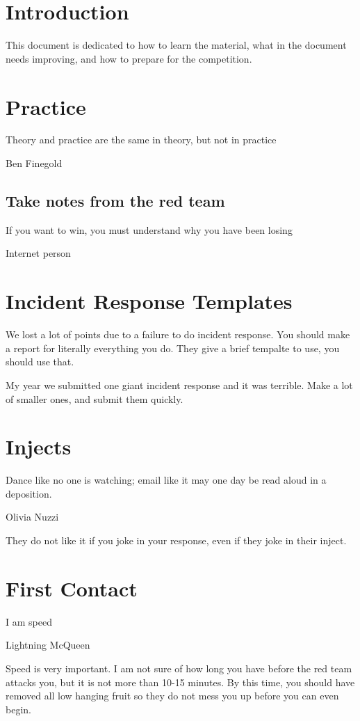 \documentclass{article}
\begin{document}
\graphicspath{ {./Images/} }
\tableofcontents

\section{Introduction}
This document is dedicated to how to learn the material, what in the document needs improving, and how to prepare for the competition.

\section{Practice}
\epigraph{Theory and practice are the same in theory, but not in practice}{Ben Finegold}

\subsection{Take notes from the red team}
\epigraph{If you want to win, you must understand why you have been losing}{Internet person}

\section{Incident Response Templates}
We lost a lot of points due to a failure to do incident response. You should make a report for literally everything you do.
They give a brief tempalte to use, you should use that.

My year we submitted one giant incident response and it was terrible. Make a lot of smaller ones, and submit them quickly.

\section{Injects}
\epigraph{Dance like no one is watching; email like it may one day be read aloud in a deposition.}{Olivia Nuzzi}

They do not like it if you joke in your response, even if they joke in their inject.

\section{First Contact}
\epigraph{I am speed}{Lightning McQueen}

Speed is very important. I am not sure of how long you have before the red team attacks you, but it is not more than 10-15 minutes.
By this time, you should have removed all low hanging fruit so they do not mess you up before you can even begin.
\end{document}
